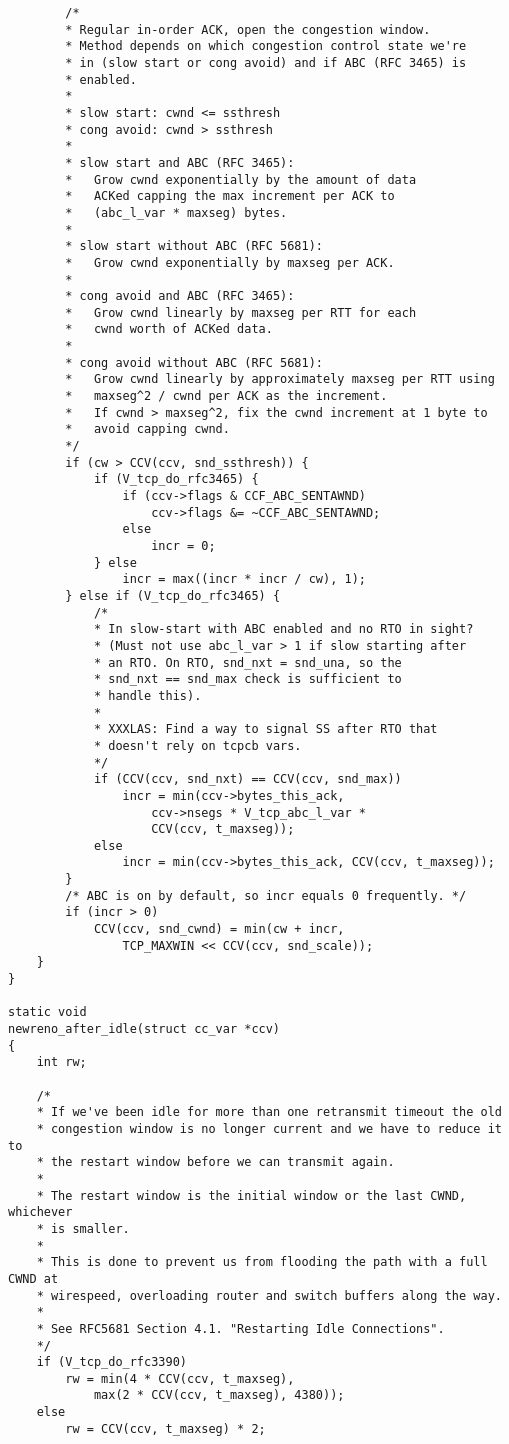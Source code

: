 \begin{code}
\begin{verbatim}
        /*
        * Regular in-order ACK, open the congestion window.
        * Method depends on which congestion control state we're
        * in (slow start or cong avoid) and if ABC (RFC 3465) is
        * enabled.
        *
        * slow start: cwnd <= ssthresh
        * cong avoid: cwnd > ssthresh
        *
        * slow start and ABC (RFC 3465):
        *   Grow cwnd exponentially by the amount of data
        *   ACKed capping the max increment per ACK to
        *   (abc_l_var * maxseg) bytes.
        *
        * slow start without ABC (RFC 5681):
        *   Grow cwnd exponentially by maxseg per ACK.
        *
        * cong avoid and ABC (RFC 3465):
        *   Grow cwnd linearly by maxseg per RTT for each
        *   cwnd worth of ACKed data.
        *
        * cong avoid without ABC (RFC 5681):
        *   Grow cwnd linearly by approximately maxseg per RTT using
        *   maxseg^2 / cwnd per ACK as the increment.
        *   If cwnd > maxseg^2, fix the cwnd increment at 1 byte to
        *   avoid capping cwnd.
        */
        if (cw > CCV(ccv, snd_ssthresh)) {
            if (V_tcp_do_rfc3465) {
                if (ccv->flags & CCF_ABC_SENTAWND)
                    ccv->flags &= ~CCF_ABC_SENTAWND;
                else
                    incr = 0;
            } else
                incr = max((incr * incr / cw), 1);
        } else if (V_tcp_do_rfc3465) {
            /*
            * In slow-start with ABC enabled and no RTO in sight?
            * (Must not use abc_l_var > 1 if slow starting after
            * an RTO. On RTO, snd_nxt = snd_una, so the
            * snd_nxt == snd_max check is sufficient to
            * handle this).
            *
            * XXXLAS: Find a way to signal SS after RTO that
            * doesn't rely on tcpcb vars.
            */
            if (CCV(ccv, snd_nxt) == CCV(ccv, snd_max))
                incr = min(ccv->bytes_this_ack,
                    ccv->nsegs * V_tcp_abc_l_var *
                    CCV(ccv, t_maxseg));
            else
                incr = min(ccv->bytes_this_ack, CCV(ccv, t_maxseg));
        }
        /* ABC is on by default, so incr equals 0 frequently. */
        if (incr > 0)
            CCV(ccv, snd_cwnd) = min(cw + incr,
                TCP_MAXWIN << CCV(ccv, snd_scale));
    }
}

static void
newreno_after_idle(struct cc_var *ccv)
{
    int rw;

    /*
    * If we've been idle for more than one retransmit timeout the old
    * congestion window is no longer current and we have to reduce it to
    * the restart window before we can transmit again.
    *
    * The restart window is the initial window or the last CWND, whichever
    * is smaller.
    *
    * This is done to prevent us from flooding the path with a full CWND at
    * wirespeed, overloading router and switch buffers along the way.
    *
    * See RFC5681 Section 4.1. "Restarting Idle Connections".
    */
    if (V_tcp_do_rfc3390)
        rw = min(4 * CCV(ccv, t_maxseg),
            max(2 * CCV(ccv, t_maxseg), 4380));
    else
        rw = CCV(ccv, t_maxseg) * 2;


\end{verbatim}
\end{code}
